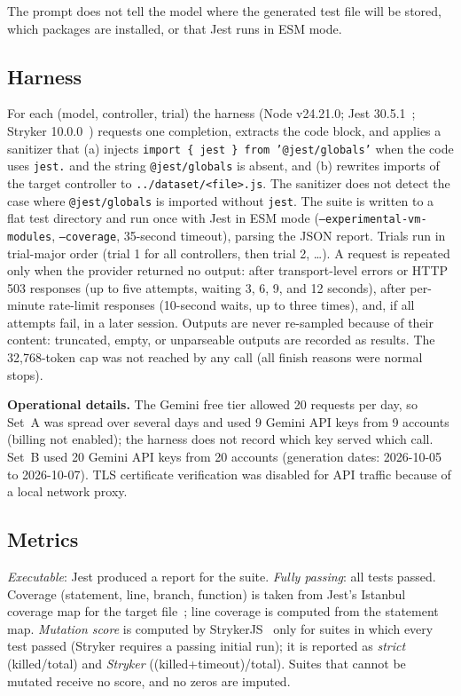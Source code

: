 \documentclass[11pt]{article}
\begin{document}
The prompt does not tell the model where the generated test file will be stored, which packages are installed, or that Jest runs in ESM mode.

\subsection{Harness}
For each (model, controller, trial) the harness (Node v24.21.0; Jest 30.5.1~\cite{jest2026}; Stryker 10.0.0~\cite{stryker2026}) requests one completion, extracts the code block, and applies a sanitizer that (a) injects \texttt{import \{ jest \} from '@jest/globals'} when the code uses \texttt{jest.} and the string \texttt{@jest/globals} is absent, and (b) rewrites imports of the target controller to \texttt{../dataset/<file>.js}. The sanitizer does not detect the case where \texttt{@jest/globals} is imported without \texttt{jest}. The suite is written to a flat test directory and run once with Jest in ESM mode (\texttt{--experimental-vm-modules}, \texttt{--coverage}, 35-second timeout), parsing the JSON report. Trials run in trial-major order (trial 1 for all controllers, then trial 2, \dots). A request is repeated only when the provider returned no output: after transport-level errors or HTTP 503 responses (up to five attempts, waiting 3, 6, 9, and 12 seconds), after per-minute rate-limit responses (10-second waits, up to three times), and, if all attempts fail, in a later session. Outputs are never re-sampled because of their content: truncated, empty, or unparseable outputs are recorded as results. The 32{,}768-token cap was not reached by any call (all finish reasons were normal stops).

\textbf{Operational details.} The Gemini free tier allowed 20 requests per day, so Set~A was spread over several days and used 9 Gemini API keys from 9 accounts (billing not enabled); the harness does not record which key served which call. Set~B used 20 Gemini API keys from 20 accounts (generation dates: 2026-10-05 to 2026-10-07). TLS certificate verification was disabled for API traffic because of a local network proxy.

\subsection{Metrics}
\textit{Executable}: Jest produced a report for the suite. \textit{Fully passing}: all tests passed. Coverage (statement, line, branch, function) is taken from Jest's Istanbul coverage map for the target file~\cite{istanbul2026}; line coverage is computed from the statement map. \textit{Mutation score} is computed by StrykerJS~\cite{stryker2026} only for suites in which every test passed (Stryker requires a passing initial run); it is reported as \emph{strict} (killed/total) and \emph{Stryker} ((killed+timeout)/total). Suites that cannot be mutated receive no score, and no zeros are imputed.
\end{document}
